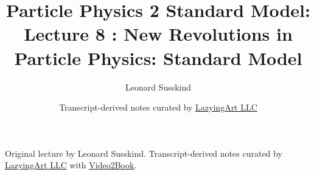 \documentclass[11pt,oneside]{book}
\begin{document}
\frontmatter
\title{Particle Physics 2 Standard Model: Lecture 8 : New Revolutions in Particle Physics: Standard Model}
\author{Leonard Susskind}
\date{Transcript-derived notes curated by \href{https://lazying.art}{LazyingArt LLC}}
\maketitle
\begin{center}
\small Original lecture by Leonard Susskind. Transcript-derived notes curated by \href{https://lazying.art}{LazyingArt LLC} with \href{https://github.com/lachlanchen/Video2Book}{Video2Book}.
\end{center}
\clearpage
\mainmatter

\end{document}
